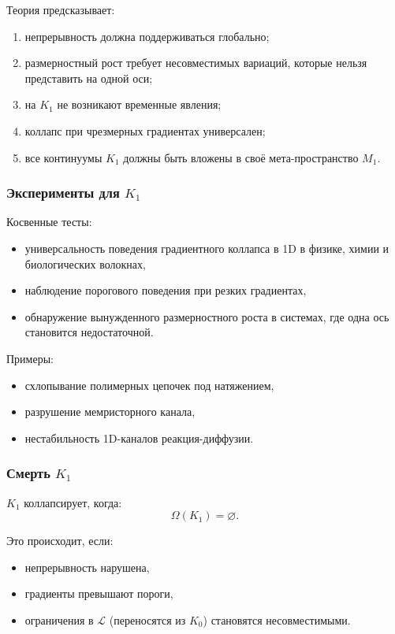 Теория предсказывает:
\begin{enumerate}
    \item непрерывность должна поддерживаться глобально;
    \item размерностный рост требует несовместимых вариаций, которые нельзя
          представить на одной оси;
    \item на $K_1$ не возникают временные явления;
    \item коллапс при чрезмерных градиентах универсален;
    \item все континуумы $K_1$ должны быть вложены в своё мета-пространство $M_1$.
\end{enumerate}

\subsubsection{Эксперименты для \texorpdfstring{$K_1$}{K_1}}

Косвенные тесты:
\begin{itemize}
    \item универсальность поведения градиентного коллапса в 1D в физике,
          химии и биологических волокнах,
    \item наблюдение порогового поведения при резких градиентах,
    \item обнаружение вынужденного размерностного роста в системах,
          где одна ось становится недостаточной.
\end{itemize}

Примеры:
\begin{itemize}
    \item схлопывание полимерных цепочек под натяжением,
    \item разрушение мемристорного канала,
    \item нестабильность 1D-каналов реакция-диффузии.
\end{itemize}

\subsubsection{Смерть \texorpdfstring{$K_1$}{K_1}}

$K_1$ коллапсирует, когда:
\[
\Omega(K_1) = \varnothing.
\]

Это происходит, если:
\begin{itemize}
    \item непрерывность нарушена,
    \item градиенты превышают пороги,
    \item ограничения в $\mathcal{L}$ (переносятся из $K_0$) становятся
          несовместимыми.
\end{itemize}

